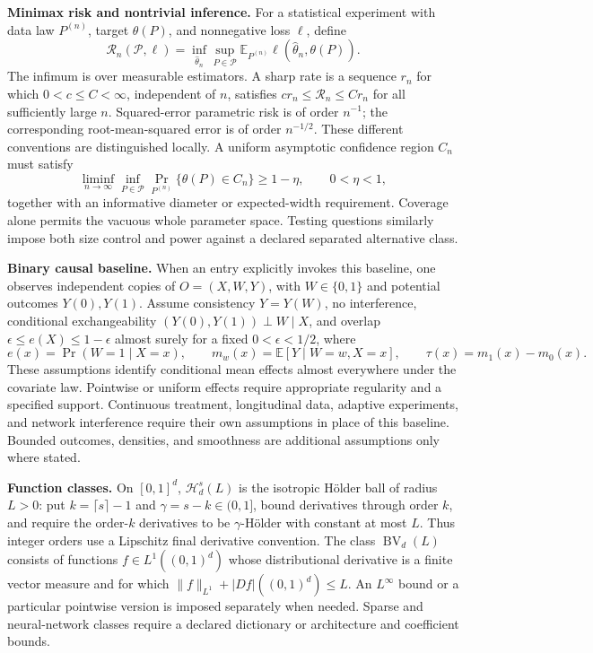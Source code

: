 \documentclass[11pt,a4paper]{article}
\newcommand{\E}{\mathbb E}
\begin{document}
\textbf{Minimax risk and nontrivial inference.}
For a statistical experiment with data law $P^{(n)}$, target $\theta(P)$,
and nonnegative loss $\ell$, define
\[
 \mathcal R_n(\mathcal P,\ell)
   =\inf_{\widehat\theta_n}\sup_{P\in\mathcal P}
      \E_{P^{(n)}}\ell(\widehat\theta_n,\theta(P)).
\]
The infimum is over measurable estimators. A sharp rate is a sequence
$r_n$ for which $0<c\leq C<\infty$, independent of $n$, satisfies
$c r_n\leq\mathcal R_n\leq C r_n$ for all sufficiently large $n$.
Squared-error parametric risk is of order $n^{-1}$; the corresponding
root-mean-squared error is of order $n^{-1/2}$. These different conventions
are distinguished locally. A uniform asymptotic confidence region $C_n$
must satisfy
\[
 \liminf_{n\to\infty}\inf_{P\in\mathcal P}
     \Pr_{P^{(n)}}\{\theta(P)\in C_n\}\geq 1-\eta,
 \qquad 0<\eta<1,
\]
together with an informative diameter or expected-width requirement.
Coverage alone permits the vacuous whole parameter space. Testing questions
similarly impose both size control and power against a declared separated
alternative class.

\textbf{Binary causal baseline.}
When an entry explicitly invokes this baseline, one observes independent
copies of $O=(X,W,Y)$, with $W\in\{0,1\}$ and potential outcomes $Y(0),Y(1)$.
Assume consistency $Y=Y(W)$, no interference, conditional exchangeability
$(Y(0),Y(1))\perp W\mid X$, and overlap
$\epsilon\leq e(X)\leq1-\epsilon$ almost surely for a fixed
$0<\epsilon<1/2$, where
\[
 e(x)=\Pr(W=1\mid X=x),\qquad
 m_w(x)=\E[Y\mid W=w,X=x],\qquad
 \tau(x)=m_1(x)-m_0(x).
\]
These assumptions identify conditional mean effects almost everywhere
under the covariate law. Pointwise or uniform effects require appropriate
regularity and a specified support. Continuous treatment, longitudinal
data, adaptive experiments, and network interference require their own
assumptions in place of this baseline. Bounded outcomes, densities, and
smoothness are additional assumptions only where stated.

\textbf{Function classes.}
On $[0,1]^d$, $\mathcal H_d^s(L)$ is the isotropic Hölder ball of radius
$L>0$: put $k=\lceil s\rceil-1$ and $\gamma=s-k\in(0,1]$, bound derivatives
through order $k$, and require the order-$k$ derivatives to be
$\gamma$-Hölder with constant at most $L$. Thus integer orders use a
Lipschitz final derivative convention. The class
$\operatorname{BV}_d(L)$ consists of functions $f\in L^1((0,1)^d)$ whose
distributional derivative is a finite vector measure and for which
$\|f\|_{L^1}+|Df|((0,1)^d)\leq L$.
An $L^\infty$ bound or a particular pointwise version is imposed separately
when needed. Sparse and neural-network classes require a declared
dictionary or architecture and coefficient bounds.
\end{document}
